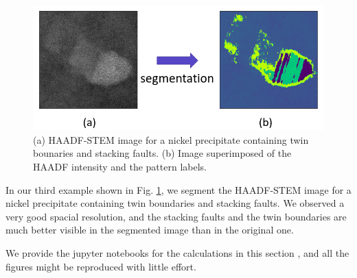 \documentclass[twocolumn,amsmath, floatfix]{revtex4}
\begin{document}
\begin{figure}
    \centering
    \includegraphics[width=0.8\columnwidth]{nickel_precipitate.png}
    \caption{ (a) HAADF-STEM image for a nickel precipitate containing twin bounaries and stacking faults. (b) Image superimposed of the HAADF intensity and the pattern labels.   }
    \label{fig:nickel_precipitate}
\end{figure}

In our third example shown in Fig. \ref{fig:nickel_precipitate}, we segment the HAADF-STEM image for a nickel precipitate containing twin boundaries and stacking faults. We observed a very good spacial resolution, and the stacking faults and the twin boundaries are much better visible in the segmented image than in the original one.

We provide the jupyter notebooks for the calculations in this section \cite{pystem}, and all the figures might be reproduced with little effort. 


\end{document}
